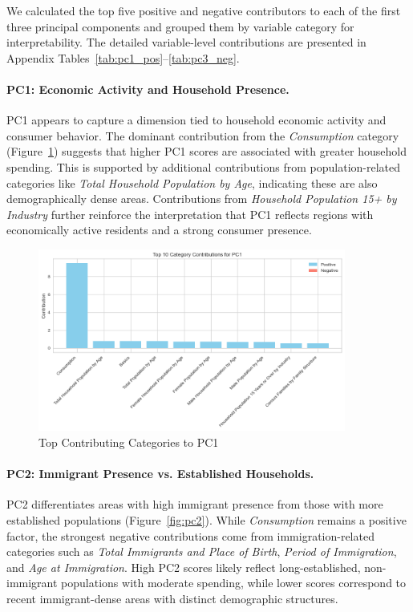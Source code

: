 \documentclass{article}
\begin{document}
We calculated the top five positive and negative contributors to each of the first three principal components and grouped them by variable category for interpretability. The detailed variable-level contributions are presented in Appendix Tables~\ref{tab:pc1_pos}--\ref{tab:pc3_neg}.

\paragraph{PC1: Economic Activity and Household Presence.}  
PC1 appears to capture a dimension tied to household economic activity and consumer behavior. The dominant contribution from the \textit{Consumption} category (Figure~\ref{fig:pc1}) suggests that higher PC1 scores are associated with greater household spending. This is supported by additional contributions from population-related categories like \textit{Total Household Population by Age}, indicating these are also demographically dense areas. Contributions from \textit{Household Population 15+ by Industry} further reinforce the interpretation that PC1 reflects regions with economically active residents and a strong consumer presence.

\begin{figure}[H]
    \centering
    \includegraphics[width=0.9\textwidth]{figures/pc1_contribs.png}
    \caption{Top Contributing Categories to PC1}
    \label{fig:pc1}
\end{figure}

\paragraph{PC2: Immigrant Presence vs. Established Households.}  
PC2 differentiates areas with high immigrant presence from those with more established populations (Figure~\ref{fig:pc2}). While \textit{Consumption} remains a positive factor, the strongest negative contributions come from immigration-related categories such as \textit{Total Immigrants and Place of Birth}, \textit{Period of Immigration}, and \textit{Age at Immigration}. High PC2 scores likely reflect long-established, non-immigrant populations with moderate spending, while lower scores correspond to recent immigrant-dense areas with distinct demographic structures.
\end{document}
